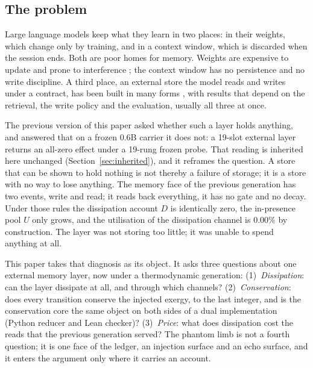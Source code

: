 \documentclass[11pt,a4paper]{article}
\begin{document}
\subsection{The problem}
Large language models keep what they learn in two places: in their weights, which change only by training, and in a context window, which is discarded when the session ends. Both are poor homes for memory. Weights are expensive to update and prone to interference \citep{ewc2017,dewange2022}; the context window has no persistence and no write discipline. A third place, an external store the model reads and writes under a contract, has been built in many forms \citep{memgpt2023,hipporag2024,memorybank2023,amem2025}, with results that depend on the retrieval, the write policy and the evaluation, usually all three at once.

The previous version of this paper asked whether such a layer holds anything, and answered that on a frozen 0.6B carrier it does not: a 19-slot external layer returns an all-zero effect under a 19-rung frozen probe. That reading is inherited here unchanged (Section~\ref{sec:inherited}), and it reframes the question. A store that can be shown to hold nothing is not thereby a failure of storage; it is a store with no way to lose anything. The memory face of the previous generation has two events, write and read; it reads back everything, it has no gate and no decay. Under those rules the dissipation account $D$ is identically zero, the in-presence pool $U$ only grows, and the utilisation of the dissipation channel is $0.00\%$ by construction. The layer was not storing too little; it was unable to spend anything at all.

This paper takes that diagnosis as its object. It asks three questions about one external memory layer, now under a thermodynamic generation: (1)~\emph{Dissipation}: can the layer dissipate at all, and through which channels? (2)~\emph{Conservation}: does every transition conserve the injected exergy, to the last integer, and is the conservation core the same object on both sides of a dual implementation (Python reducer and Lean checker)? (3)~\emph{Price}: what does dissipation cost the reads that the previous generation served? The phantom limb is not a fourth question; it is one face of the ledger, an injection surface and an echo surface, and it enters the argument only where it carries an account.
\end{document}
